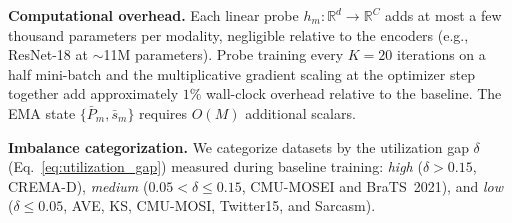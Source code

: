\documentclass{article}
\newcommand{\probe}{h}
\begin{document}
\textbf{Computational overhead.} Each linear probe $\probe_m\colon \mathbb{R}^d \to \mathbb{R}^C$ adds at most a few thousand parameters per modality, negligible relative to the encoders (e.g., ResNet-18 at $\sim$11M parameters). Probe training every $K{=}20$ iterations on a half mini-batch and the multiplicative gradient scaling at the optimizer step together add approximately $1\%$ wall-clock overhead relative to the baseline. The EMA state $\{\bar{P}_m, \bar{s}_m\}$ requires $O(M)$ additional scalars.

\textbf{Imbalance categorization.}
\label{sec:imbalance_cat}
We categorize datasets by the utilization gap $\delta$ (Eq.~\eqref{eq:utilization_gap}) measured during baseline training: \emph{high} ($\delta > 0.15$, CREMA-D), \emph{medium} ($0.05 < \delta \leq 0.15$, CMU-MOSEI and BraTS~2021), and \emph{low} ($\delta \leq 0.05$, AVE, KS, CMU-MOSI, Twitter15, and Sarcasm).
\end{document}
